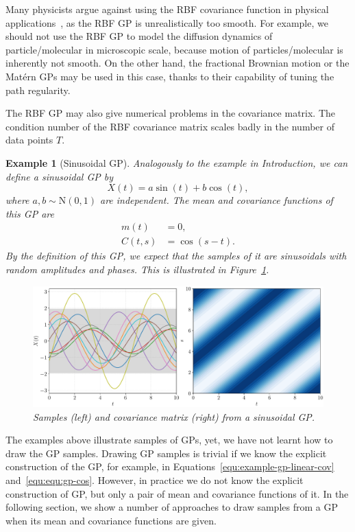 \documentclass[]{article}
\newtheorem{example}[theorem]{Example}
\begin{document}
Many physicists argue against using the RBF covariance function in physical applications~\citep[see, e.g.,][]{Stein1999}, as the RBF GP is unrealistically too smooth. For example, we should not use the RBF GP to model the diffusion dynamics of particle/molecular in microscopic scale, because motion of particles/molecular is inherently not smooth. On the other hand, the fractional Brownian motion or the Mat\'{e}rn GPs may be used in this case, thanks to their capability of tuning the path regularity.

The RBF GP may also give numerical problems in the covariance matrix. The condition number of the RBF covariance matrix scales badly in the number of data points $T$.

\begin{example}[Sinusoidal GP]
	\label{example:sin-gp}
	Analogously to the example in Introduction, we can define a sinusoidal GP by
	\begin{equation}
		X(t) = a \sin(t) + b \cos(t),
		\label{equ:equ:gp-cos}
	\end{equation}
	where $a, b \sim \mathrm{N}(0, 1)$ are independent. The mean and covariance functions of this GP are
	\begin{equation*}
		\begin{split}
			m(t) &= 0, \\
			C(t, s) &= \cos(s - t).
		\end{split}
	\end{equation*}
	By the definition of this GP, we expect that the samples of it are sinusoidals with random amplitudes and phases. This is illustrated in Figure~\ref{fig:cos-gp}.
	\begin{figure}[t!]
		\centering
		\includegraphics[width=.9\linewidth]{figs/sample-cov-cos}
		\caption{Samples (left) and covariance matrix (right) from a sinusoidal GP.}
		\label{fig:cos-gp}
	\end{figure}
\end{example}

The examples above illustrate samples of GPs, yet, we have not learnt how to draw the GP samples. Drawing GP samples is trivial if we know the explicit construction of the GP, for example, in Equations~\eqref{equ:example-gp-linear-cov} and~\eqref{equ:equ:gp-cos}. However, in practice we do not know the explicit construction of GP, but only a pair of mean and covariance functions of it. In the following section, we show a number of approaches to  draw samples from a GP when its mean and covariance functions are given.
\end{document}
